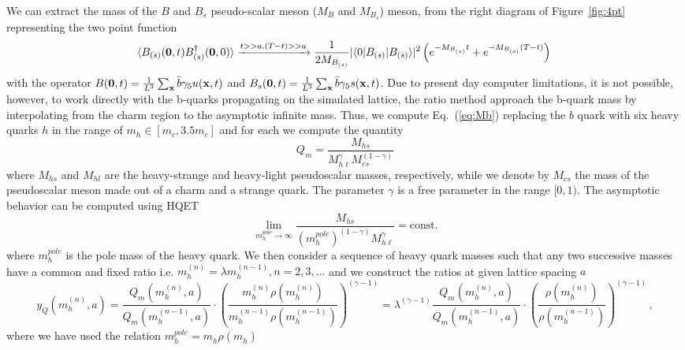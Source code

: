 We can extract the mass of the $B$ and $B_s$ pseudo-scalar meson ($M_{B}$ and $M_{B_s}$) meson,
from the right diagram of Figure~\ref{fig:4pt} representing the two point function
\begin{equation}
  \langle B_{(s)}(\bm{0},t) B_{(s)}^\dagger({\bf 0},0)\rangle\xrightarrow{t>>a, (T-t)>>a}
  \frac{1}{2M_{B_{(s)}}}|\langle 0 | B_{(s)} | B_{(s)}\rangle|^2\left(e^{-M_{B_{(s)}} t}+e^{-M_{B_{(s)}}(T-t)}\right)
  \, \label{eq:Mb}
\end{equation}
with the operator $B({\bf 0},t)=\frac{1}{L^3}\sum_{\bf x}\bar b\gamma_5 u({\bf x},t)$
and $B_s({\bf 0},t)=\frac{1}{L^3}\sum_{\bf x}\bar b\gamma_5 s({\bf x},t)$.
Due to present day computer limitations, it is not possible, however, to work directly
with the b-quarks propagating on the simulated lattice, the ratio method approach the
b-quark mass by interpolating from the charm region to the asymptotic infinite mass.
Thus, we compute Eq.~(\ref{eq:Mb}) replacing the $b$ quark with six heavy quarks $h$
in the range of $m_h\in [m_c,3.5m_c]$
and for each we compute the quantity
\begin{equation}
  Q_m = \frac{M_{hs}}{M_{h\ell}^\gamma M_{cs}^{(1-\gamma)}}
  \label{eq:ratio_Q}
\end{equation}
where $M_{hs}$ and $M_{hl}$ are the heavy-strange and heavy-light
pseudoscalar masses, respectively, while we denote by $M_{cs}$
the mass of the pseudoscalar meson made out of a charm
and a strange quark. The parameter $\gamma$ is a free parameter in the range  $[0, 1)$.
The asymptotic behavior can be computed using HQET
\begin{equation}
  \lim_{ m^{pole}_h\to \infty}
  \frac{M_{hs}}{( m^{pole}_h)^{(1-\gamma)} M_{h\ell}^\gamma}=\mbox{const.}
  \label{eq:yHQFTlim}
\end{equation}
where $ m^{pole}_h$ is the pole mass of the heavy quark.
We then consider a sequence of heavy quark masses such that any two
successive masses have a common and fixed ratio i.e.
$ m_h^{(n)}=\lambda m_h^{(n-1)}, n=2,3,...$ and we construct the ratios
at given lattice spacing $a$
\begin{equation}
  y_Q( m^{(n)}_h,a)=\frac{Q_m( m_h^{(n)},a)}{Q_m( m_h^{(n-1)},a)}\cdot
  \left(\frac{ m_{h}^{(n)} \rho( m_{h}^{(n)})}{ m_{h}^{(n-1)}\rho( m_{h}^{(n-1)})}\right)^{(\gamma-1)}
  =\lambda^{(\gamma-1)}\frac{Q_m( m_h^{(n)},a)}{Q_m( m_h^{(n-1)},a)}\cdot
  \left(\frac{ \rho( m_{h}^{(n)})}{\rho( m_{h}^{(n-1)})}\right)^{(\gamma-1)}\,,
\end{equation}
where we have used the relation  $ m^{pole}_h= m_{h}^{} \rho( m_{h}^{})$
